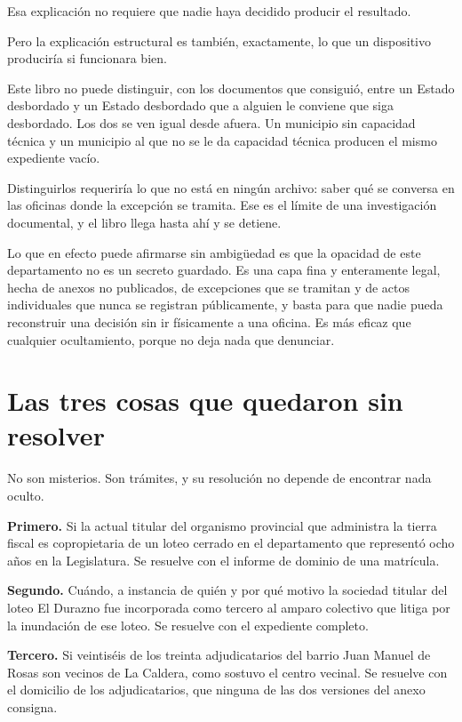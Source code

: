 Esa explicación no requiere que nadie haya decidido producir el resultado.

\begin{cautela}
Pero la explicación estructural es también, exactamente, lo que un dispositivo produciría si funcionara bien.

Este libro no puede distinguir, con los documentos que consiguió, entre un Estado desbordado y un Estado desbordado que a alguien le conviene que siga desbordado. Los dos se ven igual desde afuera. Un municipio sin capacidad técnica y un municipio al que no se le da capacidad técnica producen el mismo expediente vacío.

Distinguirlos requeriría lo que no está en ningún archivo: saber qué se conversa en las oficinas donde la excepción se tramita. Ese es el límite de una investigación documental, y el libro llega hasta ahí y se detiene.

Lo que en efecto puede afirmarse sin ambigüedad es que la opacidad de este departamento no es un secreto guardado. Es una capa fina y enteramente legal, hecha de anexos no publicados, de excepciones que se tramitan y de actos individuales que nunca se registran públicamente, y basta para que nadie pueda reconstruir una decisión sin ir físicamente a una oficina. Es más eficaz que cualquier ocultamiento, porque no deja nada que denunciar.
\end{cautela}

\section{Las tres cosas que quedaron sin resolver}

No son misterios. Son trámites, y su resolución no depende de encontrar nada oculto.

\textbf{Primero.} Si la actual titular del organismo provincial que administra la tierra fiscal es copropietaria de un loteo cerrado en el departamento que representó ocho años en la Legislatura. Se resuelve con el informe de dominio de una matrícula.

\textbf{Segundo.} Cuándo, a instancia de quién y por qué motivo la sociedad titular del loteo El Durazno fue incorporada como tercero al amparo colectivo que litiga por la inundación de ese loteo. Se resuelve con el expediente completo.

\textbf{Tercero.} Si veintiséis de los treinta adjudicatarios del barrio Juan Manuel de Rosas son vecinos de La Caldera, como sostuvo el centro vecinal. Se resuelve con el domicilio de los adjudicatarios, que ninguna de las dos versiones del anexo consigna.

